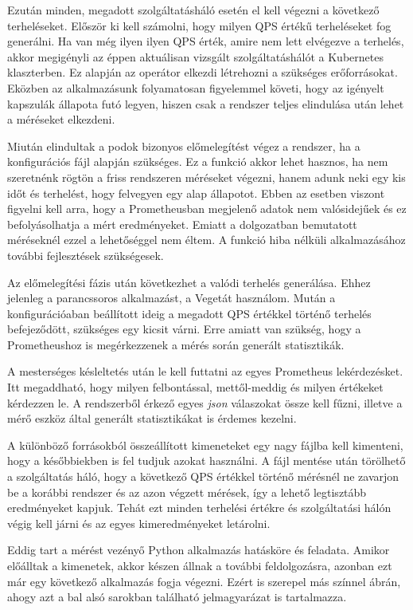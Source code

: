 Ezután minden, megadott szolgáltatásháló esetén el kell végezni a következő terheléseket.
Először ki kell számolni, hogy milyen QPS értékű terheléseket fog generálni.
Ha van még ilyen ilyen QPS érték, amire nem lett elvégezve a terhelés, akkor megigényli az éppen aktuálisan vizsgált szolgáltatáshálót a Kubernetes klaszterben.
Ez alapján az operátor elkezdi létrehozni a szükséges erőforrásokat. 
Eközben az alkalmazásunk folyamatosan figyelemmel követi, hogy az igényelt kapszulák állapota futó legyen, hiszen csak a rendszer teljes elindulása után lehet a méréseket elkezdeni.

Miután elindultak a podok bizonyos előmelegítést végez a rendszer, ha a konfigurációs fájl alapján szükséges.
Ez a funkció akkor lehet hasznos, ha nem szeretnénk rögtön a friss rendszeren méréseket végezni, hanem adunk neki egy kis időt és terhelést, hogy felvegyen egy alap állapotot.
Ebben az esetben viszont figyelni kell arra, hogy a Prometheusban megjelenő adatok nem valósidejűek és ez befolyásolhatja a mért eredményeket.
Emiatt a dolgozatban bemutatott méréseknél ezzel a lehetőséggel nem éltem.
A funkció hiba nélküli alkalmazásához további fejlesztések szükségesek.

Az előmelegítési fázis után következhet a valódi terhelés generálása.
Ehhez jelenleg a parancssoros alkalmazást, a Vegetát használom.
Mután a konfigurációaban beállított ideig a megadott QPS értékkel történő terhelés befejeződött, szükséges egy kicsit várni.
Erre amiatt van szükség, hogy a Prometheushoz is megérkezzenek a mérés során generált statisztikák.

A mesterséges késleltetés után le kell futtatni az egyes Prometheus lekérdezésket.
Itt megaddható, hogy milyen felbontással, mettől-meddig és milyen értékeket kérdezzen le.
A rendszerből érkező egyes \textit{json} válaszokat össze kell fűzni, illetve a mérő eszköz által generált statisztikákat is érdemes kezelni.

A különböző forrásokból összeállított kimeneteket egy nagy fájlba kell kimenteni, hogy a későbbiekben is fel tudjuk azokat használni.
A fájl mentése után törölhető a szolgáltatás háló, hogy a következő QPS értékkel történő mérésnél ne zavarjon be a korábbi rendszer és az azon végzett  mérések, így a lehető legtisztább eredményeket kapjuk.
Tehát ezt minden terhelési értékre és szolgáltatási hálón végig kell járni és az egyes kimeredményeket letárolni.

Eddig tart a mérést vezényő Python alkalmazás hatásköre és feladata.
Amikor előálltak a kimenetek, akkor készen állnak a további feldolgozásra, azonban ezt már egy következő alkalmazás fogja végezni.
Ezért is szerepel más színnel  ábrán, ahogy azt a bal alsó sarokban található jelmagyarázat is tartalmazza.

